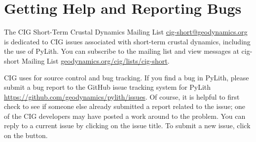 \section{Getting Help and Reporting Bugs}
\label{sec:help}

The CIG Short-Term
Crustal Dynamics Mailing List \url{cig-short@geodynamics.org} is
dedicated to CIG issues associated with short-term crustal dynamics,
including the use of PyLith. You can subscribe to the mailing list and
view messages at cig-short Mailing List
\url{geodynamics.org/cig/lists/cig-short}.

CIG uses  for source control and bug tracking. If you
find a bug in PyLith, please submit a bug report to the GitHub issue
tracking system for PyLith \url{https://github.com/geodynamics/pylith/issues}.
Of course, it is helpful to first check to see if someone else already
submitted a report related to the issue; one of the CIG developers
may have posted a work around to the problem. You can reply to a current
issue by clicking on the issue title. To submit a new issue, click
on the  button.


